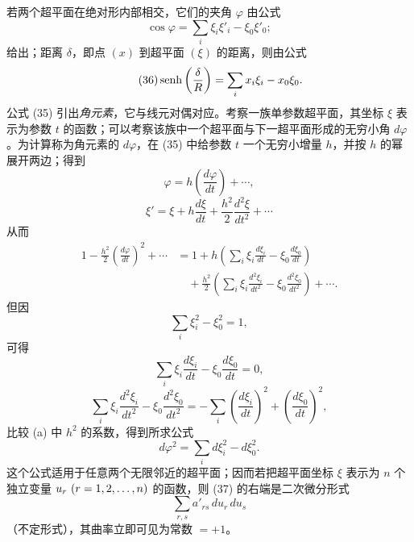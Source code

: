 若两个超平面在绝对形内部相交，它们的夹角 $\varphi$ 由公式
\[
\tag{35}
 \cos\varphi=\sum_i\xi_i\xi'_i-\xi_0\xi'_0;
\]
给出；距离 $\delta$，即点 $(x)$ 到超平面 $(\xi)$ 的距离，则由公式
\[
\tag{36}
 \operatorname{senh}\left(\frac\delta R\right)=\sum_i x_i\xi_i-x_0\xi_0.
\]
公式 (35) 引出\emph{角元素}，它与线元对偶对应。考察一族单参数超平面，其坐标 $\xi$ 表示为参数 $t$ 的函数；可以考察该族中一个超平面与下一超平面形成的无穷小角 $d\varphi$。为计算称为角元素的 $d\varphi$，在 (35) 中给参数 $t$ 一个无穷小增量 $h$，并按 $h$ 的幂展开两边；得到
\[
 \varphi=h\left(\frac{d\varphi}{dt}\right)+\cdots,
\]
\[
 \xi'=\xi+h\frac{d\xi}{dt}+\frac{h^2}{2}\frac{d^2\xi}{dt^2}+\cdots
\]
从而
\[
\tag{a}
\begin{aligned}
1-\frac{h^2}{2}\left(\frac{d\varphi}{dt}\right)^2+\cdots
&=1+h\left(\sum_i\xi_i\frac{d\xi_i}{dt}-\xi_0\frac{d\xi_0}{dt}\right) \\
&\quad +\frac{h^2}{2}\left(\sum_i\xi_i\frac{d^2\xi_i}{dt^2}-\xi_0\frac{d^2\xi_0}{dt^2}\right)+\cdots .
\end{aligned}
\]
但因
\[
 \sum_i\xi_i^2-\xi_0^2=1,
\]
可得
\[
 \sum_i\xi_i\frac{d\xi_i}{dt}-\xi_0\frac{d\xi_0}{dt}=0,
\]
\[
 \sum_i\xi_i\frac{d^2\xi_i}{dt^2}-\xi_0\frac{d^2\xi_0}{dt^2}
 =-\sum_i\left(\frac{d\xi_i}{dt}\right)^2+\left(\frac{d\xi_0}{dt}\right)^2,
\]
比较 (a) 中 $h^2$ 的系数，得到所求公式
\[
\tag{37}
 d\varphi^2=\sum_i d\xi_i^2-d\xi_0^2.
\]
这个公式适用于任意两个无限邻近的超平面；因而若把超平面坐标 $\xi$ 表示为 $n$ 个独立变量 $u_r\ (\pxChThirteenIndependentRange)$ 的函数，则 (37) 的右端是二次微分形式
\[
 \sum_{r,s}a'_{rs}\,du_r\,du_s
\]
（不定形式），其曲率立即可见为常数 $=+1$。

